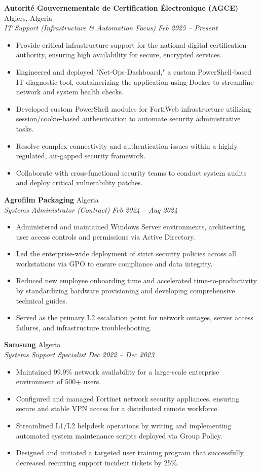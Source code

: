 \documentclass[11pt,a4paper]{article}
\newcommand{\resumeItem}[4]{
  \vspace{1.5mm}
  \noindent\textbf{#1} \hfill #2 \\
  \textit{#3} \hfill \textit{#4} \par\vspace{1mm}
}
\begin{document}
\resumeItem{Autorité Gouvernementale de Certification Électronique (AGCE)}{Algiers, Algeria}
{IT Support (Infrastructure \& Automation Focus)}{Feb 2025 -- Present}
\begin{itemize}[leftmargin=0.15in, itemsep=1pt]
    \item Provide critical infrastructure support for the national digital certification authority, ensuring high availability for secure, encrypted services.
    \item Engineered and deployed "Net-Ops-Dashboard," a custom PowerShell-based IT diagnostic tool, containerizing the application using Docker to streamline network and system health checks.
    \item Developed custom PowerShell modules for FortiWeb infrastructure utilizing session/cookie-based authentication to automate security administrative tasks.
    \item Resolve complex connectivity and authentication issues within a highly regulated, air-gapped security framework.
    \item Collaborate with cross-functional security teams to conduct system audits and deploy critical vulnerability patches.
\end{itemize}

\resumeItem{Agrofilm Packaging}{Algeria}
{Systems Administrator (Contract)}{Feb 2024 -- Aug 2024}
\begin{itemize}[leftmargin=0.15in, itemsep=1pt]
    \item Administered and maintained Windows Server environments, architecting user access controls and permissions via Active Directory.
    \item Led the enterprise-wide deployment of strict security policies across all workstations via GPO to ensure compliance and data integrity.
    \item Reduced new employee onboarding time and accelerated time-to-productivity by standardizing hardware provisioning and developing comprehensive technical guides.
    \item Served as the primary L2 escalation point for network outages, server access failures, and infrastructure troubleshooting.
\end{itemize}

\resumeItem{Samsung}{Algeria}
{Systems Support Specialist}{Dec 2022 -- Dec 2023}
\begin{itemize}[leftmargin=0.15in, itemsep=1pt]
    \item Maintained 99.9\% network availability for a large-scale enterprise environment of 500+ users.
    \item Configured and managed Fortinet network security appliances, ensuring secure and stable VPN access for a distributed remote workforce.
    \item Streamlined L1/L2 helpdesk operations by writing and implementing automated system maintenance scripts deployed via Group Policy.
    \item Designed and initiated a targeted user training program that successfully decreased recurring support incident tickets by 25\%.
\end{itemize}
\end{document}
